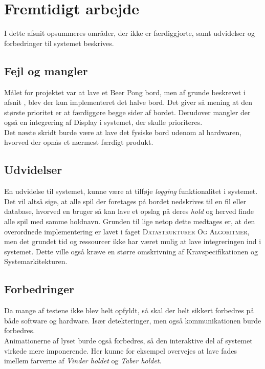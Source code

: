 \documentclass[Rapport/Rapport_main.tex]{subfiles}
\begin{document}
\section{Fremtidigt arbejde}
I dette afsnit opsummeres områder, der ikke er færdiggjorte, samt udvidelser og forbedringer til systemet beskrives.
\subsection{Fejl og mangler}
Målet for projektet var at lave et Beer Pong bord, men af grunde beskrevet i afsnit  , blev der kun implementeret det halve bord. Det giver så mening at den største prioritet er at færdiggøre begge sider af bordet. Derudover mangler der også en integrering af Display i  systemet, der skulle prioriteres.\\
Det næste skridt burde være at lave det fysiske bord udenom al hardwaren, hvorved der opnås et nærmest færdigt produkt.

\subsection{Udvidelser}
En udvidelse til systemet, kunne være at tilføje \textit{logging} funktionalitet i systemet. Det vil altså sige, at alle spil der foretages på bordet nedskrives til en fil eller database, hvorved en bruger så kan lave et opslag på deres \textit{hold} og herved finde alle spil med samme holdnavn. Grunden til lige netop dette medtages er, at den overordnede implementering er lavet i faget \textsc{Datastrukturer Og Algoritmer}, men det grundet tid og ressourcer ikke har været mulig at lave integreringen ind i systemet. Dette ville også kræve en større omskrivning af Kravspecifikationen og Systemarkitekturen.

\subsection{Forbedringer}
Da mange af testene ikke blev helt opfyldt, så skal der helt sikkert forbedres på både software og hardware. Især detekteringer, men også kommunikationen burde forbedres.\\
Animationerne af lyset burde også forbedres, så den interaktive del af systemet virkede mere imponerende. Her kunne for eksempel overvejes at lave fades imellem farverne af \textit{Vinder holdet} og \textit{Taber holdet}.
\end{document}
